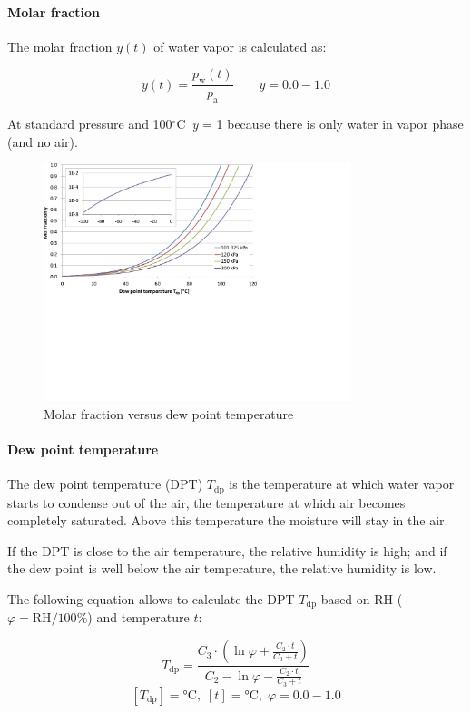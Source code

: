 \documentclass[11pt,a4paper,english,twoside]{scrreprt}
\newcommand{\gradC}{${}^\circ$C}      %
\begin{document}
\paragraph{Molar fraction}

The molar fraction $y(t)$ of water vapor is calculated as:

\[y(t)=\frac{p_\text{w}(t)}{p_\text{a}} \qquad y=0.0-1.0\]


At standard pressure and 100\gradC\ \textit{y} = 1 because there is only water in vapor phase (and no air).

\begin{figure}
  \centering
  \includegraphics*[width=0.8\textwidth,angle=0]{FCF_Diag_mol_y.pdf}
  \caption[Molar fraction versus dew point temperature]{Molar fraction versus dew point temperature}
\end{figure}


\paragraph{Dew point temperature}

The dew point temperature (DPT) $T_\text{dp}$ is the temperature at which water vapor starts to condense out of the air, the temperature at which air becomes completely saturated. Above this temperature the moisture will stay in the air.

If the DPT is close to the air temperature, the relative humidity is high; and if the dew point is well below the air temperature, the relative humidity is low.

The following equation allows to calculate the DPT $T_\text{dp}$ based on RH ($\varphi = \text{RH}/100\%$) and temperature $t$:


\[T_\text{dp} =\frac{C_3 \cdot \left(\ln \varphi +\frac{C_2 \cdot t}{C_3 + t} \right)}{C_2 -\ln \varphi -\frac{C_2 \cdot t}{C_3 + t} } \]
\[[T_\text{dp}] = \si{\degreeCelsius},\; [t] = \si{\degreeCelsius},\; \varphi = \num{0.0} - \num{1.0}\]
\end{document}
